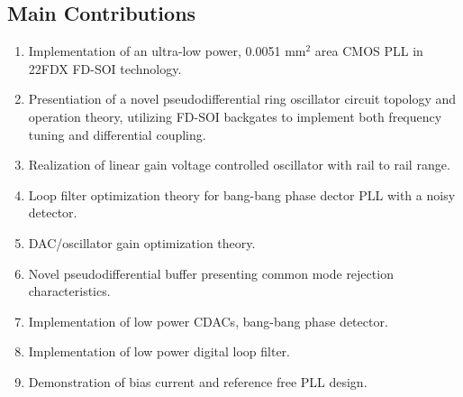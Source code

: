 %

\vspace{1em}

\subsection{Main Contributions}
\vspace{-0.8em}
\begin{enumerate}[itemsep=0pt,label=\protect\mycirc{\arabic*}]
	\setlength\itemsep{-0.8em}
	\item Implementation of an ultra-low power, 0.0051 mm$^2$ area CMOS PLL in 22FDX FD-SOI technology.
	\item Presentiation of a novel pseudodifferential ring oscillator circuit topology and operation theory, utilizing FD-SOI backgates to implement both frequency tuning and differential coupling.
	\item Realization of linear gain voltage controlled oscillator with rail to rail range. 
	\item Loop filter optimization theory for bang-bang phase dector PLL with a noisy detector.
	\item DAC/oscillator gain optimization theory.
	\item Novel pseudodifferential buffer presenting common mode rejection characteristics.
	\item Implementation of low power CDACs, bang-bang phase detector.
	\item Implementation of low power digital loop filter.
	\item Demonstration of bias current and reference free PLL design.
\end{enumerate}
